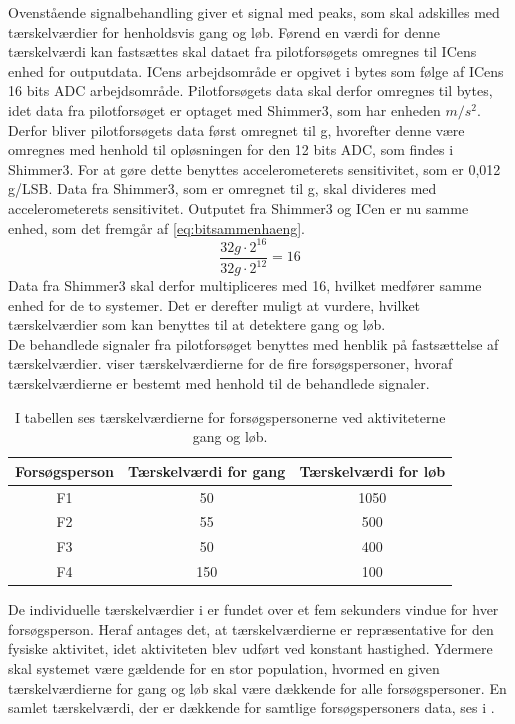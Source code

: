 Ovenstående signalbehandling giver et signal med peaks, som skal adskilles med tærskelværdier for henholdsvis gang og løb. Førend en værdi for denne tærskelværdi kan fastsættes skal dataet fra pilotforsøgets omregnes til ICens enhed for outputdata. ICens arbejdsområde er opgivet i bytes som følge af ICens 16 bits ADC arbejdsområde. Pilotforsøgets data skal derfor omregnes til bytes, idet data fra pilotforsøget er optaget med Shimmer3, som har enheden $m/s^{2}$. Derfor bliver pilotforsøgets data først omregnet til g, hvorefter denne være omregnes med henhold til opløsningen for den 12 bits ADC, som findes i Shimmer3. For at gøre dette benyttes accelerometerets sensitivitet, som er 0,012 g/LSB. Data fra Shimmer3, som er omregnet til g, skal divideres med accelerometerets sensitivitet. Outputet fra Shimmer3 og ICen er nu samme enhed, som det fremgår af \eqref{eq:bitsammenhaeng}.
\begin{equation}
\frac{32 g \cdot 2^{16}}{32 g \cdot 2^{12}} = 16
\label{eq:bitsammenhaeng}
\end{equation}
Data fra Shimmer3 skal derfor multipliceres med 16, hvilket medfører samme enhed for de to systemer. Det er derefter muligt at vurdere, hvilket tærskelværdier som kan benyttes til at detektere gang og løb.\\
De behandlede signaler fra pilotforsøget benyttes med henblik på fastsættelse af tærskelværdier.  viser tærskelværdierne for de fire forsøgspersoner, hvoraf tærskelværdierne er bestemt med henhold til de behandlede signaler. 
\begin{table}[H]
	\centering
	\begin{tabular}{ccc}
		\hline
		\rowcolor[HTML]{C0C0C0} 
		Forsøgsperson & Tærskelværdi for gang & Tærskelværdi for løb \\ \hline
		\rowcolor[HTML]{FFFFFF} 
		F1 & 50 & 1050 \\ \hline
		\rowcolor[HTML]{FFFFFF} 
		F2 & 55 & 500 \\ \hline
		\rowcolor[HTML]{FFFFFF} 
		F3 & 50 & 400 \\ \hline
		\rowcolor[HTML]{FFFFFF} 
		F4 & 150 & 100 \\ \hline
	\end{tabular}
	\caption{I tabellen ses tærskelværdierne for forsøgspersonerne ved aktiviteterne gang og løb.}
	\label{tab:individuel_taerskel}
\end{table}\vspace{-0.5cm}
De individuelle tærskelværdier i  er fundet over et fem sekunders vindue for hver forsøgsperson. Heraf antages det, at tærskelværdierne er repræsentative for den fysiske aktivitet, idet aktiviteten blev udført ved konstant hastighed. Ydermere skal systemet være gældende for en stor population, hvormed en given tærskelværdierne for gang og løb skal være dækkende for alle forsøgspersoner. En samlet tærskelværdi, der er dækkende for samtlige forsøgspersoners data, ses i .
